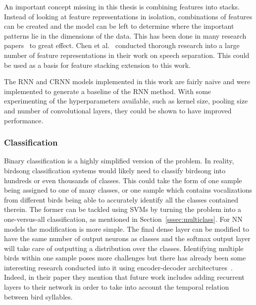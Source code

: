An important concept missing in this thesis is combining features into stacks.
Instead of looking at feature representations in isolation, combinations of
features can be created and the model can be left to determine where the
important patterns lie in the dimensions of the data. This has been done in many
research papers~\cite{yan2021birdsong,ramashini2019bird,somervuo2006parametric}
to great effect. Chen et al.~\cite{chen2014feature} conducted thorough research
into a large number of feature representations in their work on speech
separation. This could be used as a basis for feature stacking extension to this
work.

The RNN and CRNN models implemented in this work are fairly naive and were
implemented to generate a baseline of the RNN method. With some experimenting of
the hyperparameters available, such as kernel size, pooling size and number of
convolutional layers, they could be shown to have improved performance.

\subsubsection{Classification}

Binary classification is a highly simplified version of the problem. In reality,
birdsong classification systems would likely need to classify birdsong into
hundreds or even thousands of classes. This could take the form of one sample
being assigned to one of many classes, or one sample which contains
vocalizations from different birds being able to accurately identify all the
classes contained therein. The former can be tackled using SVMs by turning the
problem into a one-versus-all classification, as mentioned in
Section~\ref{sssec:multiclass}. For NN models the modification is more simple.
The final dense layer can be modified to have the same number of output neurons
as classes and the softmax output layer will take care of outputting a
distribution over the classes. Identifying multiple birds within one sample
poses more challenges but there has already been some interesting research
conducted into it using encoder-decoder
architectures~\cite{narasimhan2017simultaneous}. Indeed, in their paper they
mention that future work includes adding recurrent layers to their network in
order to take into account the temporal relation between bird syllables.
